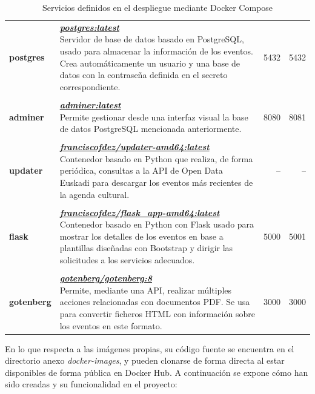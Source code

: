 \documentclass{report}
\begin{document}
\begin{table}[H]
\begin{tabularx}{\textwidth}{lXrr}
                \\ \textbf{postgres} & {\parbox{5cm}{\textit{\textbf{\href{https://hub.docker.com/_/postgres}{postgres:latest}}} \\ Servidor de base de datos basado en PostgreSQL, usado para almacenar la información de los eventos. Crea automáticamente un usuario y una base de datos con la contraseña definida en el secreto correspondiente.}} & 5432 & 5432 \\
                \\ \textbf{adminer} & {\parbox{5cm}{\textit{\textbf{\href{https://hub.docker.com/_/adminer/}{adminer:latest}}}\\ Permite gestionar desde una interfaz visual la base de datos PostgreSQL mencionada anteriormente.}} & 8080 & 8081 \\
                \\ \textbf{updater} & {\parbox{5cm}{\textit{\textbf{\href{https://hub.docker.com/r/franciscofdez/updater-amd64}{franciscofdez/updater-amd64:latest}}} \\ Contenedor basado en Python que realiza, de forma periódica, consultas a la API de Open Data Euskadi para descargar los eventos más recientes de la agenda cultural.}} & -- & -- \\
                \\ \textbf{flask} & {\parbox{5cm}{\textbf{\textit{\href{https://hub.docker.com/r/franciscofdez/flask_app-amd64}{franciscofdez/flask\_app-amd64:latest}}} \\ Contenedor basado en Python con Flask usado para mostrar los detalles de los eventos en base a plantillas diseñadas con Bootstrap y dirigir las solicitudes a los servicios adecuados.}} & 5000 & 5001 \\
                \\ \textbf{gotenberg} & {\parbox{5cm}{\textit{\textbf{\href{https://hub.docker.com/r/gotenberg/gotenberg}{gotenberg/gotenberg:8}}} \\ Permite, mediante una API, realizar múltiples acciones relacionadas con documentos PDF. Se usa para convertir ficheros HTML con información sobre los eventos en este formato.}} & 3000 & 3000 \\
                \bottomrule
            \end{tabularx}
        \caption{Servicios definidos en el despliegue mediante Docker Compose}
        \label{tab:docker}
        \end{table}

        En lo que respecta a las imágenes propias, su código fuente se encuentra en el directorio anexo \textit{docker-images}, y pueden clonarse de forma directa al estar disponibles de forma pública en Docker Hub. A continuación se expone cómo han sido creadas y su funcionalidad en el proyecto:
\end{document}
